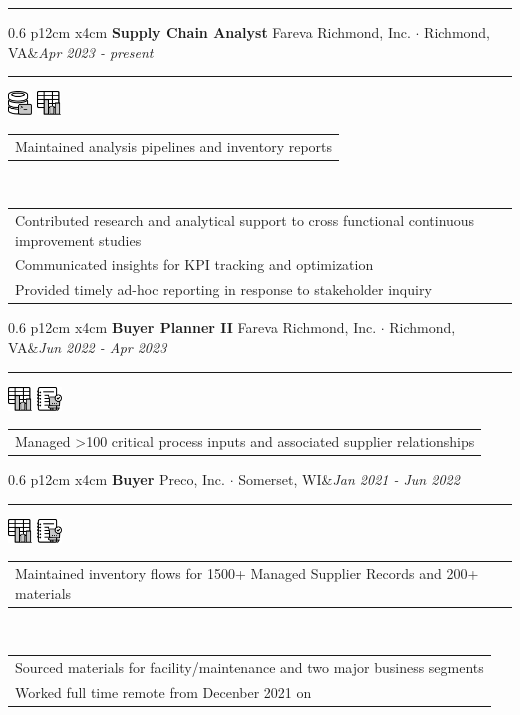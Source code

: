 \documentclass[10pt,A4]{article}
\newcommand{\tzlarrow}{(0,0) -- (0.2,0) -- (0.3,0.2) -- (0.2,0.4) -- (0,0.4) -- (0.1,0.2) -- cycle;}
\newcommand{\larrow}[1]
{\begin{tikzpicture}[scale=0.58]
	 \filldraw[fill=#1!100,draw=#1!100!black]  \tzlarrow
 \end{tikzpicture}
}
\newcommand{\cvevent}[5]
{
\vspace{8pt}
	\begin{tabular*}{0.6\linewidth}{ p{12cm} x{4cm}}
\textbf{#2} \hspace{4pt} {#3}&\textit{#1}\\[4pt]
	\end{tabular*}
        
        \vspace{-6pt}

\textcolor{softcol}{\hrule}
\vspace{-2pt}
\hspace{14.3cm}
#4 \\[-18pt-6pt]
\vspace{6pt}
	\begin{tabular*}{1\textwidth}{l}
	\vspace{-0.85cm} \larrow{sectcol} #5\\[4.5pt]
	\end{tabular*}
}
\newcommand{\cveventshort}[5]
{
\vspace{8pt}
	\begin{tabular*}{0.6\linewidth}{ p{12cm} x{4cm}}
\textbf{#2} \hspace{4pt} {#3}&\textit{#1}\\[4pt]
	\end{tabular*}
        
        \vspace{-6pt}
       
\textcolor{softcol}{\hrule}
\vspace{-2pt}
\hspace{14.3cm}
#4 \\[-18pt-6pt]
\vspace{6pt}
	\begin{tabular*}{1\textwidth}{l}
	\vspace{-0.85cm} \larrow{sectcol} #5\\[6pt]
	\end{tabular*}
\vspace{-3pt}
}
\newcommand{\oneextra}[1]
{ \vspace{-0.85cm+24pt} \\
\begin{tabular*}{1\textwidth}{l}
		 \larrow{softcol}  #1\\[6pt]
	\end{tabular*}
\vspace{-3pt}
}
\newcommand{\twoextra}[2]
{ \vspace{-0.85cm+24pt} \\
\begin{tabular*}{1\textwidth}{l}
		 \larrow{softcol}  #1\\[4.5pt]
		 \larrow{softcol}  #2\\[6pt]
	\end{tabular*}
\vspace{-3pt}
}
\newcommand{\threeextra}[3]
{ \vspace{-0.85cm+24pt} \\
\begin{tabular*}{1\textwidth}{l}
		 \larrow{softcol}  #1\\[4.5pt]
		 \larrow{softcol}  #2\\[4.5pt]
		 \larrow{softcol}  #3\\[6pt]
	\end{tabular*}
\vspace{-3pt}
}
\begin{document}
\begin{minipage}[c][0.5\textheight][t]{\linewidth}
\vspace{3.3cm}
  \hspace{18.5cm}
\textcolor{sectcol}{\rule[-3.4cm]{2pt}{7.2cm}}
\hspace{12pt}

\vspace{-9.8cm}
\hspace{26pt}
\parbox[c]{0.8\linewidth}{
%
  \cvevent{Apr 2023 - present}{Supply Chain Analyst}{Fareva Richmond, Inc.  $\cdot$  Richmond, VA}
   {\hspace{22.2222pt}\includegraphics[height=18pt]{img/DBgraphic} \hspace{2pt} \includegraphics[height=18pt]{img/chartgraphic}}
{Maintained analysis pipelines and inventory reports}
\threeextra{Contributed research and analytical support to cross functional continuous improvement studies}{Communicated insights for KPI tracking and optimization}{Provided timely ad-hoc reporting in response to stakeholder inquiry}


%
  \cveventshort{Jun 2022 - Apr 2023}{Buyer Planner II}{Fareva Richmond, Inc.  $\cdot$  Richmond, VA}
{ \hspace{20.2222pt} \includegraphics[height=18pt]{img/chartgraphic} \hspace{2pt} \includegraphics[height=18pt]{img/notebookgraphic}}
{Managed >100 critical process inputs and associated supplier relationships}



%
  \cvevent{Jan 2021 - Jun 2022}{Buyer}{Preco, Inc.  $\cdot$  Somerset, WI}
{ \hspace{20.2222pt} \includegraphics[height=18pt]{img/chartgraphic} \hspace{2pt} \includegraphics[height=18pt]{img/notebookgraphic}}
{Maintained inventory flows for 1500+ Managed Supplier Records and 200+ materials}
  \twoextra{Sourced materials for facility/maintenance and two major business segments}{Worked full time remote from Decenber 2021 on}

}
\end{minipage}
\end{document}
